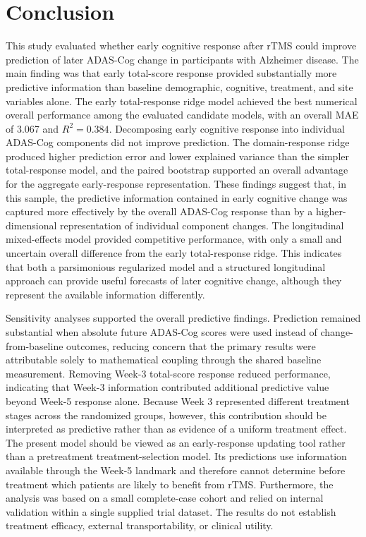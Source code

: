 \documentclass[11pt]{article}
\begin{document}
\section{Conclusion}

This study evaluated whether early cognitive response after rTMS could improve prediction of later ADAS-Cog change in participants with Alzheimer disease. The main finding was that early total-score response provided substantially more predictive information than baseline demographic, cognitive, treatment, and site variables alone. The early total-response ridge model achieved the best numerical overall performance among the evaluated candidate models, with an overall MAE of 3.067 and $R^2=0.384$. Decomposing early cognitive response into individual ADAS-Cog components did not improve prediction. The domain-response ridge produced higher prediction error and lower explained variance than the simpler total-response model, and the paired bootstrap supported an overall advantage for the aggregate early-response representation. These findings suggest that, in this sample, the predictive information contained in early cognitive change was captured more effectively by the overall ADAS-Cog response than by a higher-dimensional representation of individual component changes. The longitudinal mixed-effects model provided competitive performance, with only a small and uncertain overall difference from the early total-response ridge. This indicates that both a parsimonious regularized model and a structured longitudinal approach can provide useful forecasts of later cognitive change, although they represent the available information differently.

Sensitivity analyses supported the overall predictive findings. Prediction remained substantial when absolute future ADAS-Cog scores were used instead of change-from-baseline outcomes, reducing concern that the primary results were attributable solely to mathematical coupling through the shared baseline measurement. Removing Week-3 total-score response reduced performance, indicating that Week-3 information contributed additional predictive value beyond Week-5 response alone. Because Week 3 represented different treatment stages across the randomized groups, however, this contribution should be interpreted as predictive rather than as evidence of a uniform treatment effect. The present model should be viewed as an early-response updating tool rather than a pretreatment treatment-selection model. Its predictions use information available through the Week-5 landmark and therefore cannot determine before treatment which patients are likely to benefit from rTMS. Furthermore, the analysis was based on a small complete-case cohort and relied on internal validation within a single supplied trial dataset. The results do not establish treatment efficacy, external transportability, or clinical utility.
\end{document}
